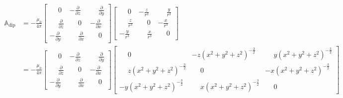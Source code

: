 \documentclass[12pt]{article}
\begin{document}
\begin{align}
\label{eqn:magnetic_induction_matrices2}
\mathbb{A}_\mathrm{dip} &= -\frac{\mu_0}{4\pi}
\begin{bmatrix}
\phantom{-}0                           &            -\frac{\partial}{\partial z} &  \phantom{-}\frac{\partial}{\partial y} \\ 
\phantom{-}\frac{\partial}{\partial z} &  \phantom{-}0                           &            -\frac{\partial}{\partial x} \\
          -\frac{\partial}{\partial y} &  \phantom{-}\frac{\partial}{\partial x} &  \phantom{-}0
\end{bmatrix}
\begin{bmatrix}
\phantom{-}0             &           -\frac{z}{r^3} & \phantom{-}\frac{y}{r^3} \\ 
\phantom{-}\frac{z}{r^3} & \phantom{-}0             &           -\frac{x}{r^3} \\
          -\frac{y}{r^3} & \phantom{-}\frac{x}{r^3} & \phantom{-}0
\end{bmatrix} \\
&= -\frac{\mu_0}{4\pi}
\begin{bmatrix}
\phantom{-}0                           &            -\frac{\partial}{\partial z} &  \phantom{-}\frac{\partial}{\partial y} \\ 
\phantom{-}\frac{\partial}{\partial z} &  \phantom{-}0                           &            -\frac{\partial}{\partial x} \\
          -\frac{\partial}{\partial y} &  \phantom{-}\frac{\partial}{\partial x} &  \phantom{-}0
\end{bmatrix}
\begin{bmatrix}
\phantom{-}0                                              &           -z\left( x^2 + y^2 + z^2 \right)^{-\frac{3}{2}} & \phantom{-}y\left( x^2 + y^2 + z^2 \right)^{-\frac{3}{2}} \\ 
\phantom{-}z\left( x^2 + y^2 + z^2 \right)^{-\frac{3}{2}} & \phantom{-}0                                              &           -x\left( x^2 + y^2 + z^2 \right)^{-\frac{3}{2}} \\
          -y\left( x^2 + y^2 + z^2 \right)^{-\frac{3}{2}} & \phantom{-}x\left( x^2 + y^2 + z^2 \right)^{-\frac{3}{2}} & \phantom{-}0
\end{bmatrix}
\end{align}
\end{document}
